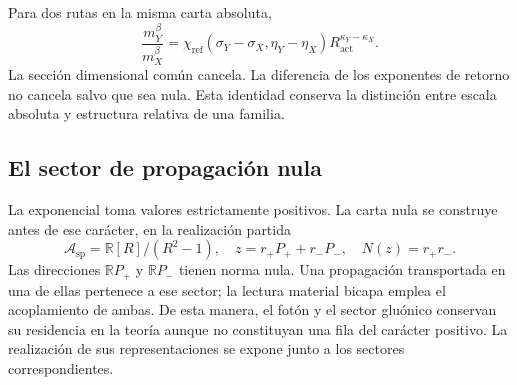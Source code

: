 Para dos rutas en la misma carta absoluta,
\[
 \frac{m_Y^\beta}{m_X^\beta}
 =\chi_{\mathrm{ref}}(\sigma_Y-\sigma_X,\eta_Y-\eta_X)
 R_{\mathrm{act}}^{\kappa_Y-\kappa_X}.
\]
La sección dimensional común cancela. La diferencia de los exponentes de
retorno no cancela salvo que sea nula. Esta identidad conserva la
distinción entre escala absoluta y estructura relativa de una familia.

\subsection{El sector de propagación nula}

La exponencial toma valores estrictamente positivos. La carta nula se
construye antes de ese carácter, en la realización partida
\[
 \mathcal A_{\mathrm{sp}}=\mathbb R[R]/(R^2-1),\quad
 z=r_+P_++r_-P_-,\quad N(z)=r_+r_-.
\]
Las direcciones \(\mathbb RP_+\) y \(\mathbb RP_-\) tienen norma
nula. Una propagación transportada en una de ellas pertenece a ese sector;
la lectura material bicapa emplea el acoplamiento de ambas. De esta manera,
el fotón y el sector gluónico conservan su residencia en la teoría aunque
no constituyan una fila del carácter positivo. La realización de sus
representaciones se expone junto a los sectores correspondientes.
